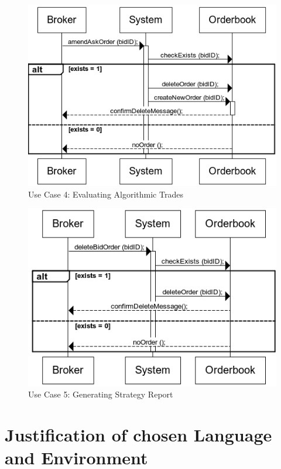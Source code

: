 \documentclass[a4paper]{article}
\begin{document}
\begin{figure}[H]
   \includegraphics[width=1\textwidth]{images/amendAskOrder}
   \caption{Use Case 4: Evaluating Algorithmic Trades}
\end{figure}

\begin{figure}[H]
   \includegraphics[width=1\textwidth]{images/deleteBidOrder}
   \caption{Use Case 5: Generating Strategy Report}
\end{figure}

\newpage

\section {Justification of chosen Language and Environment}
\end{document}
